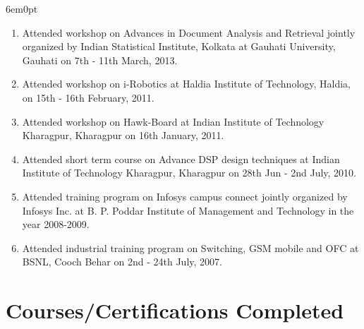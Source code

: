 \documentclass[11pt,a4paper]{moderncv}
\begin{document}
\begin{adjustwidth}{6em}{0pt}
\begin{enumerate}
		\item Attended workshop on Advances in Document Analysis and Retrieval jointly organized by Indian Statistical Institute, Kolkata at Gauhati University, Gauhati on 7th - 11th March, 2013.
		
		\item Attended workshop on i-Robotics at Haldia Institute of Technology, Haldia, on 15th - 16th February, 2011.
		
		\item Attended workshop on Hawk-Board at Indian Institute of Technology Kharagpur, Kharagpur on 16th January, 2011.
		
		\item Attended short term course on Advance DSP design techniques at Indian Institute of Technology Kharagpur, Kharagpur on 28th Jun - 2nd July, 2010.
		
		\item Attended training program on Infosys campus connect jointly organized by Infosys Inc. at B. P. Poddar Institute of Management and Technology in the year 2008-2009.
		
		\item Attended industrial training program on Switching, GSM mobile and OFC at BSNL, Cooch Behar on 2nd - 24th July, 2007.
		
	\end{enumerate}
\end{adjustwidth}



\section{\textbf{Courses/Certifications Completed}}
\end{document}

